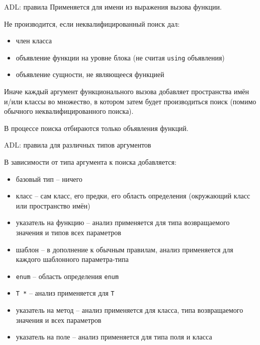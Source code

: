 \documentclass[unknownkeysallowed,xcolor=table]{beamer}
\begin{document}
\begin{frame}{ADL: правила}
Применяется для имени из выражения вызова функции.

\vspace{1em}

Не производится, если неквалифицированный поиск дал:
\begin{itemize}
  \item член класса
  \item объявление функции на уровне блока (не считая \lstinline{using} объявления)
  \item объявление сущности, не являющееся функцией
\end{itemize}

\vspace{1em}

Иначе каждый аргумент функционального вызова добавляет пространства имён и/или классы во множество, в котором затем будет производиться поиск (помимо обычного неквалифицированного поиска).

\vspace{1em}

В процессе поиска отбираются только объявления функций.
\end{frame}

\begin{frame}{ADL: правила для различных типов аргументов}

В зависимости от типа аргумента к поиска добавляется:

\begin{itemize}
  \item базовый тип -- ничего
  \item класс -- сам класс, его предки, его область определения (окружающий класс или пространство имён)
  \item указатель на функцию -- анализ применяется для типа возвращаемого значения и типов всех параметров
  \item шаблон -- в дополнение к обычным правилам, анализ применяется для каждого шаблонного параметра-типа
  \item \lstinline{enum} -- область определения \lstinline{enum}
  \item \lstinline{T *} -- анализ применяется для \lstinline{T}
  \item указатель на метод -- анализ применяется для класса, типа возвращаемого значения и всех параметров
  \item указатель на поле -- анализ применяется для типа поля и класса
\end{itemize}
\end{frame}
\end{document}
